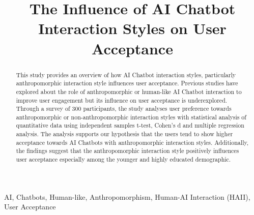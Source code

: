 \documentclass[conference]{IEEEtran}
\begin{document}
\title{The Influence of AI Chatbot Interaction Styles on User Acceptance}

\author{
	}

\maketitle

\begin{abstract}
	This study provides an overview of how AI Chatbot interaction styles, particularly anthropomorphic interaction style influences user acceptance. Previous studies have explored about the role of anthropomorphic or human-like AI Chatbot interaction to improve user engagement but its influence on user acceptance is underexplored. Through a survey of 300 participants, the study analyses user preference towards anthropomorphic or non-anthropomorphic interaction styles with statistical analysis of quantitative data using independent samples t-test, Cohen’s d and multiple regression analysis. The analysis supports our hypothesis that the users tend to show higher acceptance towards AI Chatbots with anthropomorphic interaction styles. Additionally, the findings suggest that the anthropomorphic interaction style positively influences user acceptance especially among the younger and highly educated demographic.   
\end{abstract}

\begin{IEEEkeywords}
	AI, Chatbots, Human-like, Anthropomorphism, Human-AI Interaction (HAII), User Acceptance
\end{IEEEkeywords}
\end{document}
